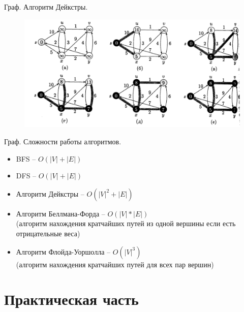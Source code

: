 \documentclass[10pt]{beamer}
\begin{document}
\begin{frame}{Граф. Алгоритм Дейкстры.}
\begin{figure}
\centerline{\includegraphics[width=1.0\linewidth]{images/deicstra_graphs.png}}
\end{figure}
\end{frame}



\begin{frame}{Граф. Сложности работы алгоритмов.}
\begin{itemize}
\item BFS -- $O(|V| + |E|)$
\item DFS -- $O(|V| + |E|)$
\item Алгоритм Дейкстры -- $O(|V|^2 + |E|)$
\item Алгоритм Беллмана-Форда -- $O(|V|*|E|)$ \\
(алгоритм нахождения кратчайших путей из одной вершины если есть отрицательные веса)
\item Алгоритм Флойда-Уоршолла -- $O(|V|^3)$ \\
(алгоритм нахождения кратчайших путей для всех пар вершин)
\end{itemize}
\end{frame}



\section{Практическая часть}
\end{document}
